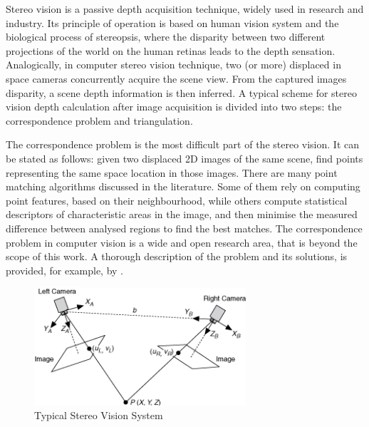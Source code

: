 Stereo vision is a passive depth acquisition technique, widely used in research and  industry. Its principle of operation is based on human vision system and the biological process of stereopsis, where the disparity between two different projections of the world on the human retinas leads to the depth sensation. Analogically, in computer stereo vision technique, two (or more) displaced in space cameras concurrently acquire the scene view. From the captured images disparity, a scene depth information is then inferred. A typical scheme for stereo vision depth calculation after image acquisition is divided into two steps: the correspondence problem and triangulation.

The correspondence problem is the most difficult part of the stereo vision. It can be stated as follows: given two displaced 2D images of the same scene, find points representing the same space location in those images. There are many point matching algorithms discussed in the literature. Some of them rely on computing point features, based on their neighbourhood, while others compute statistical descriptors of characteristic areas in the image, and then minimise the measured difference between analysed regions to find the best matches. The correspondence problem in computer vision is a wide and open research area, that is beyond the scope of this work. A thorough description of the problem and its solutions, is provided, for example, by \cite{Cyganek}.

\begin{figure}[H]
\label{fig:stereo}
\centering
\includegraphics[width=0.7\textwidth]{fig/stereovision}
\caption{Typical Stereo Vision System}
\label{fig:stereovision}
\end{figure}


